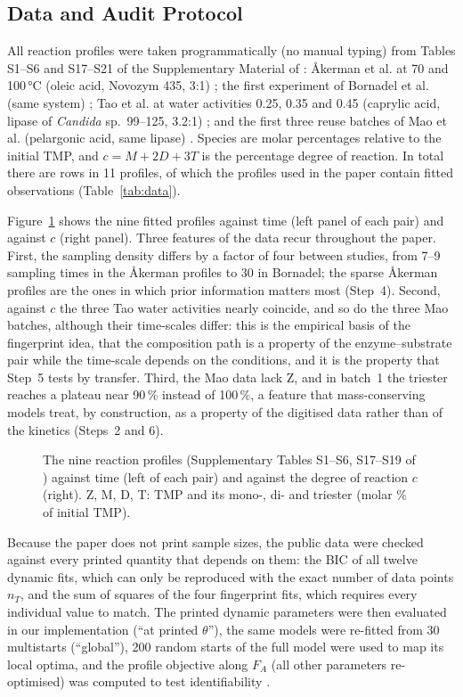 \subsection{Data and Audit Protocol}
All reaction profiles were taken programmatically (no manual typing) from Tables S1--S6 and S17--S21 of the Supplementary Material of \cite{nishimura2026}: Åkerman et al. at 70 and 100\,°C (oleic acid, Novozym 435, 3:1) \cite{akerman2011}; the first experiment of Bornadel et al. (same system) \cite{bornadel2013}; Tao et al. at water activities 0.25, 0.35 and 0.45 (caprylic acid, lipase of \emph{Candida} sp.\ 99--125, 3.2:1) \cite{tao2015}; and the first three reuse batches of Mao et al. (pelargonic acid, same lipase) \cite{mao2024}. Species are molar percentages relative to the initial TMP, and $c=M+2D+3T$ is the percentage degree of reaction. In total there are \NRows{} rows in 11 profiles, of which the \NFitProfiles{} profiles used in the paper contain \NFitPoints{} fitted observations (Table~\ref{tab:data}).

Figure~\ref{fig:data} shows the nine fitted profiles against time (left panel of each pair) and against $c$ (right panel). Three features of the data recur throughout the paper. First, the sampling density differs by a factor of four between studies, from 7--9 sampling times in the Åkerman profiles to 30 in Bornadel; the sparse Åkerman profiles are the ones in which prior information matters most (Step~4). Second, against $c$ the three Tao water activities nearly coincide, and so do the three Mao batches, although their time-scales differ: this is the empirical basis of the fingerprint idea, that the composition path is a property of the enzyme--substrate pair while the time-scale depends on the conditions, and it is the property that Step~5 tests by transfer. Third, the Mao data lack Z, and in batch~1 the triester reaches a plateau near 90\,\% instead of 100\,\%, a feature that mass-conserving models treat, by construction, as a property of the digitised data rather than of the kinetics (Steps~2 and 6).
\begin{figure}[!htbp]\centering{}\caption{The nine reaction profiles (Supplementary Tables S1--S6, S17--S19 of \cite{nishimura2026}) against time (left of each pair) and against the degree of reaction $c$ (right). Z, M, D, T: TMP and its mono-, di- and triester (molar \% of initial TMP).}\label{fig:data}\end{figure}

Because the paper does not print sample sizes, the public data were checked against every printed quantity that depends on them: the BIC of all twelve dynamic fits, which can only be reproduced with the exact number of data points $n_T$, and the sum of squares of the four fingerprint fits, which requires every individual value to match. The printed dynamic parameters were then evaluated in our implementation (``at printed $\theta$''), the same models were re-fitted from 30 multistarts (``global''), 200 random starts of the full model were used to map its local optima, and the profile objective along $F_A$ (all other parameters re-optimised) was computed to test identifiability \cite{raue2009}.

